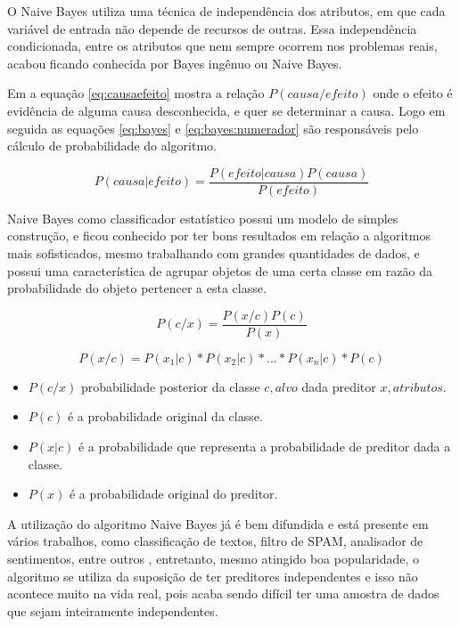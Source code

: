 O Naive Bayes utiliza uma técnica de independência dos atributos, em que cada variável de entrada não depende de recursos de outras. Essa independência condicionada, entre os atributos que nem sempre ocorrem nos problemas reais, acabou ficando conhecida por Bayes ingênuo ou Naive Bayes. 

Em  a equação \ref{eq:causaefeito} mostra a relação ${P(causa/efeito)}$ onde o efeito é evidência de alguma causa desconhecida, e quer se determinar a causa. Logo em seguida as equações \ref{eq:bayes} e \ref{eq:bayes:numerador} são responsáveis pelo cálculo de probabilidade do algoritmo.

\begin{equation} \label{eq:causaefeito}
 P(causa|efeito)= \frac{P(efeito|causa)P(causa)}{P(efeito)}
\end{equation}

Naive Bayes como classificador estatístico possui um modelo de simples construção, e ficou conhecido por ter bons resultados em relação a algoritmos mais sofisticados, mesmo trabalhando com grandes quantidades de dados, e possui uma característica de agrupar objetos de uma certa classe em razão da probabilidade do objeto pertencer a esta classe. 

\begin{equation}
 P(c/x)= \frac{P(x/c)P(c)}{P(x)}
\label{eq:bayes}
 \end{equation}

\begin{equation}
 P(x/c)=P(x_1|c)*P(x_2|c)*...*P(x_n|c)*P(c)
 \label{eq:bayes:numerador}
\end{equation}


\begin{itemize}[noitemsep]
 \item ${P(c/x)}$ probabilidade posterior da classe ${c,alvo}$ dada preditor ${x,atributos}$.
 \item ${P(c)}$  é a probabilidade original da classe.
 \item ${P(x|c)}$  é a probabilidade que representa a probabilidade de preditor dada a classe.
 \item ${P(x)}$  é a probabilidade original do preditor.
\end{itemize}

A utilização do algoritmo Naive Bayes já é bem difundida e está presente em vários trabalhos, como classificação de textos, filtro de SPAM, analisador de sentimentos, entre outros \cite{Madureira2017, Lucca2013, Wu2008, Mccallum1997}, entretanto, mesmo atingido boa popularidade, o algoritmo se utiliza da suposição de ter preditores independentes e isso não acontece muito na vida real, pois acaba sendo difícil ter uma amostra de dados que sejam inteiramente independentes. 

